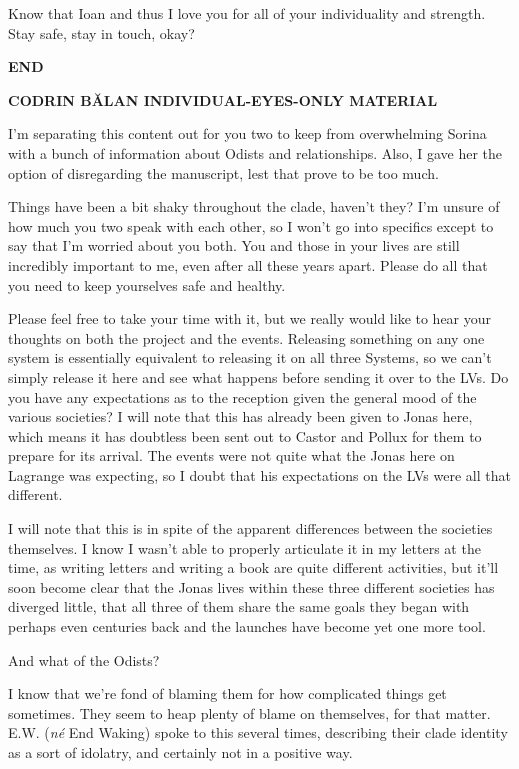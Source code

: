 Know that Ioan and thus I love you for all of your individuality and strength. Stay safe, stay in touch, okay?

\textbf{END}

\textbf{CODRIN BĂLAN INDIVIDUAL-EYES-ONLY MATERIAL}

I'm separating this content out for you two to keep from overwhelming Sorina with a bunch of information about Odists and relationships. Also, I gave her the option of disregarding the manuscript, lest that prove to be too much.

Things have been a bit shaky throughout the clade, haven't they? I'm unsure of how much you two speak with each other, so I won't go into specifics except to say that I'm worried about you both. You and those in your lives are still incredibly important to me, even after all these years apart. Please do all that you need to keep yourselves safe and healthy.

Please feel free to take your time with it, but we really would like to hear your thoughts on both the project and the events. Releasing something on any one system is essentially equivalent to releasing it on all three Systems, so we can't simply release it here and see what happens before sending it over to the LVs. Do you have any expectations as to the reception given the general mood of the various societies? I will note that this has already been given to Jonas here, which means it has doubtless been sent out to Castor and Pollux for them to prepare for its arrival. The events were not quite what the Jonas here on Lagrange was expecting, so I doubt that his expectations on the LVs were all that different.

I will note that this is in spite of the apparent differences between the societies themselves. I know I wasn't able to properly articulate it in my letters at the time, as writing letters and writing a book are quite different activities, but it'll soon become clear that the Jonas lives within these three different societies has diverged little, that all three of them share the same goals they began with perhaps even centuries back and the launches have become yet one more tool.

And what of the Odists?

I know that we're fond of blaming them for how complicated things get sometimes. They seem to heap plenty of blame on themselves, for that matter. E.W. (\emph{né} End Waking) spoke to this several times, describing their clade identity as a sort of idolatry, and certainly not in a positive way.

